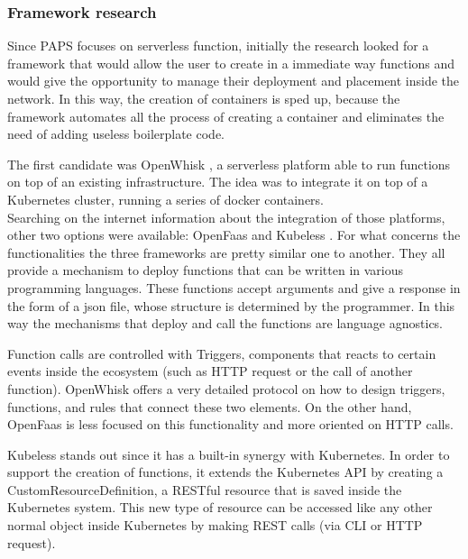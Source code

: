 \subsubsection*{Framework research}


Since PAPS focuses on serverless function, initially the research looked for a framework 
that would allow the user to create in a immediate way functions and would give the opportunity to manage their
deployment and placement inside the network.
In this way, the creation of containers is sped up, because the framework automates all the process
of creating a container and eliminates the need of adding useless boilerplate code.
\par
The first candidate was OpenWhisk \cite{OpenWhisk}, a serverless platform able to run 
functions on top of an existing infrastructure. The idea was to integrate it on top of a Kubernetes 
cluster, running a series of docker \cite{Docker} containers. \\
Searching on the internet information about the integration of those platforms, other two 
options were available: OpenFaas \cite{Faas} and Kubeless \cite{Kubeless}. For what concerns 
the functionalities the three frameworks are pretty similar one to another.
They all provide a mechanism to deploy functions that can be written in various programming languages.
These functions accept arguments and give a response in the form of a json file, whose structure
is determined by the programmer. In this way the mechanisms that deploy and call the functions are language agnostics.
\par
Function calls are controlled with Triggers, components that reacts to certain events inside the 
ecosystem (such as HTTP request or the call of another function).
OpenWhisk offers a very detailed protocol on how to design triggers, functions, and rules
that connect these two elements.
On the other hand, OpenFaas is less focused on this functionality and more oriented on HTTP calls.
\par
Kubeless stands out since it has a built-in synergy with Kubernetes. In order to support the creation of functions, 
it extends the Kubernetes API by creating a CustomResourceDefinition, a RESTful resource that is saved inside the Kubernetes
system. This new type of resource can be accessed like any other normal object inside Kubernetes
by making REST calls (via CLI or HTTP request).

